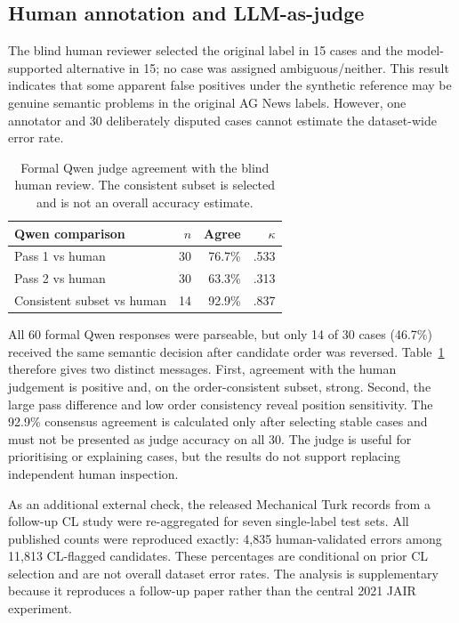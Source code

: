 \documentclass[11pt]{article}
\begin{document}
\subsection{Human annotation and LLM-as-judge}

The blind human reviewer selected the original label in 15 cases and the
model-supported alternative in 15; no case was assigned ambiguous/neither.
This result indicates that some apparent false positives under the synthetic
reference may be genuine semantic problems in the original AG News labels.
However, one annotator and 30 deliberately disputed cases cannot estimate the
dataset-wide error rate.

\begin{table}[t]
\centering
\small
\setlength{\tabcolsep}{4pt}
\begin{tabular}{lrrr}
\toprule
\textbf{Qwen comparison} & \textbf{$n$} & \textbf{Agree} & \textbf{$\kappa$} \\
\midrule
Pass 1 vs human & 30 & 76.7\% & .533 \\
Pass 2 vs human & 30 & 63.3\% & .313 \\
Consistent subset vs human & 14 & 92.9\% & .837 \\
\bottomrule
\end{tabular}
\caption{Formal Qwen judge agreement with the blind human review. The
consistent subset is selected and is not an overall accuracy estimate.}
\label{tab:qwen}
\end{table}

All 60 formal Qwen responses were parseable, but only 14 of 30 cases (46.7\%)
received the same semantic decision after candidate order was reversed.
Table~\ref{tab:qwen} therefore gives two distinct messages. First, agreement
with the human judgement is positive and, on the order-consistent subset,
strong. Second, the large pass difference and low order consistency reveal
position sensitivity. The 92.9\% consensus agreement is calculated only after
selecting stable cases and must not be presented as judge accuracy on all 30.
The judge is useful for prioritising or explaining cases, but the results do
not support replacing independent human inspection.

As an additional external check, the released Mechanical Turk records from a
follow-up CL study \citep{northcutt2021labelerrors} were re-aggregated for seven
single-label test sets. All published counts were reproduced exactly: 4,835
human-validated errors among 11,813 CL-flagged candidates. These percentages
are conditional on prior CL selection and are not overall dataset error rates.
The analysis is supplementary because it reproduces a follow-up paper rather
than the central 2021 JAIR experiment.
\end{document}
